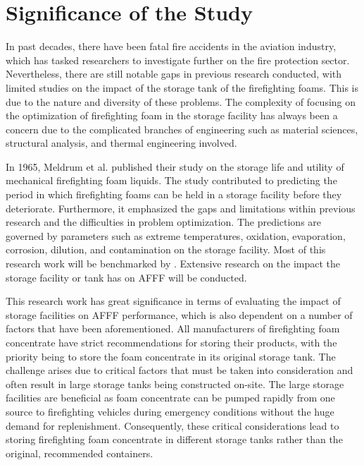 \section{Significance of the Study}
In past decades, there have been fatal fire accidents in the aviation industry, which has tasked researchers to investigate further on the fire protection sector. Nevertheless, there are still notable gaps in previous research conducted, with limited studies on the impact of the storage tank of the firefighting foams. This is due to the nature and diversity of these problems. The complexity of focusing on the optimization of firefighting foam in the storage facility has always been a concern due to the complicated branches of engineering such as material sciences, structural analysis, and thermal engineering involved. 

In 1965, Meldrum et al. \cite{meldrum1965storage} published their study on the storage life and utility of mechanical firefighting foam liquids. The study contributed to predicting the period in which firefighting foams can be held in a storage facility before they deteriorate. Furthermore, it emphasized the gaps and limitations within previous research and the difficulties in problem optimization. The predictions are governed by parameters such as extreme temperatures, oxidation, evaporation, corrosion, dilution, and contamination on the storage facility. Most of this research work will be benchmarked by \cite{meldrum1965storage}. Extensive research on the impact the storage facility or tank has on AFFF will be conducted.

This research work has great significance in terms of evaluating the impact of storage facilities on AFFF performance, which is also dependent on a number of factors that have been aforementioned. All manufacturers of firefighting foam concentrate have strict recommendations for storing their products, with the priority being to store the foam concentrate in its original storage tank. The challenge arises due to critical factors that must be taken into consideration and often result in large storage tanks being constructed on-site. The large storage facilities are beneficial as foam concentrate can be pumped rapidly from one source to firefighting vehicles during emergency conditions without the huge demand for replenishment. Consequently, these critical considerations lead to storing firefighting foam concentrate in different storage tanks rather than the original, recommended containers.

